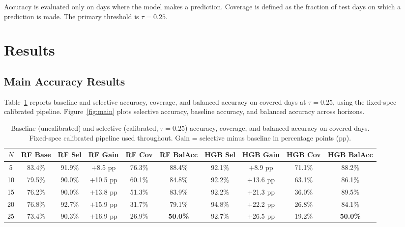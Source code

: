 \documentclass[12pt]{article}
\begin{document}
Accuracy is evaluated only on days where the model makes a prediction. Coverage is defined as the fraction of test days on which a prediction is made. The primary threshold is $\tau = 0.25$.

\section{Results}
\label{sec:results}

\subsection{Main Accuracy Results}
\label{sec:main}

Table~\ref{tab:main} reports baseline and selective accuracy, coverage, and balanced accuracy on covered days at $\tau = 0.25$, using the fixed-spec calibrated pipeline. Figure~\ref{fig:main} plots selective accuracy, baseline accuracy, and balanced accuracy across horizons.

\begin{table}[H]
\centering
\caption{Baseline (uncalibrated) and selective (calibrated, $\tau = 0.25$) accuracy, coverage, and balanced accuracy on covered days. Fixed-spec calibrated pipeline used throughout. Gain = selective minus baseline in percentage points (pp).}
\label{tab:main}
\small
\begin{tabular}{cccccccccc}
\toprule
$N$ & RF Base & RF Sel & RF Gain & RF Cov & RF BalAcc & HGB Sel & HGB Gain & HGB Cov & HGB BalAcc \\
\midrule
5  & 83.4\% & 91.9\% & $+$8.5 pp & 76.3\% & 88.4\% & 92.1\% & $+$8.9 pp & 71.1\% & 88.2\% \\
10 & 79.5\% & 90.0\% & $+$10.5 pp & 60.1\% & 84.8\% & 92.2\% & $+$13.6 pp & 63.1\% & 86.1\% \\
15 & 76.2\% & 90.0\% & $+$13.8 pp & 51.3\% & 83.9\% & 92.2\% & $+$21.3 pp & 36.0\% & 89.5\% \\
20 & 76.8\% & 92.7\% & $+$15.9 pp & 31.7\% & 79.1\% & 94.8\% & $+$22.2 pp & 26.8\% & 84.1\% \\
25 & 73.4\% & 90.3\% & $+$16.9 pp & 26.9\% & \textbf{50.0\%} & 92.7\% & $+$26.5 pp & 19.2\% & \textbf{50.0\%} \\
\bottomrule
\end{tabular}
\end{table}
\end{document}

